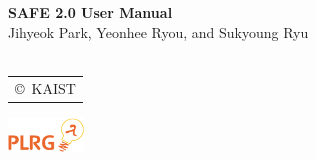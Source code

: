 \documentclass[oneside,openany,a4paper,10pt]{book}
\begin{document}
\begin{titlepage}
    \vspace*{15em}
    \centering
    {\bfseries\Huge
        SAFE 2.0 User Manual\\
    }    
        \vskip2cm
       {\Large
 Jihyeok Park, Yeonhee Ryou, and Sukyoung Ryu}\\
~\\
\large
\begin{tabular}{c}
                        \copyright\ KAIST
\end{tabular}
\includegraphics[width=2cm]{plrg-logo.png}
\end{titlepage}

\multibegin
\raggedcolumns









\normalsize



\multiend
\end{document}
